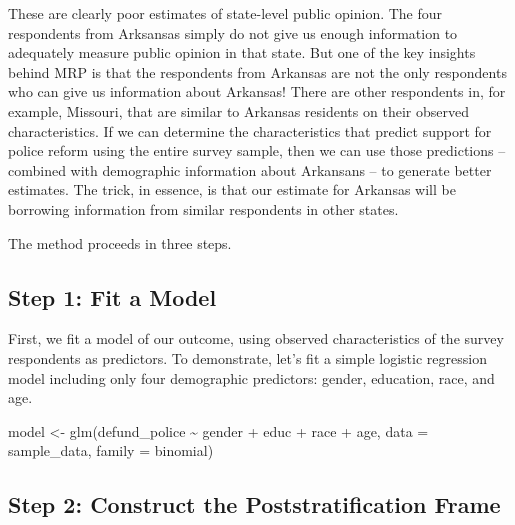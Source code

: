\documentclass[
]{article}
\newenvironment{Shaded}{\begin{snugshade}}{\end{snugshade}}
\newcommand{\AttributeTok}[1]{\textcolor[rgb]{0.77,0.63,0.00}{#1}}
\newcommand{\FunctionTok}[1]{\textcolor[rgb]{0.00,0.00,0.00}{#1}}
\newcommand{\NormalTok}[1]{#1}
\newcommand{\OtherTok}[1]{\textcolor[rgb]{0.56,0.35,0.01}{#1}}
\newcommand{\SpecialCharTok}[1]{\textcolor[rgb]{0.00,0.00,0.00}{#1}}
\newcommand{\StringTok}[1]{\textcolor[rgb]{0.31,0.60,0.02}{#1}}
\begin{document}
These are clearly poor estimates of state-level public opinion. The four
respondents from Arksansas simply do not give us enough information to
adequately measure public opinion in that state. But one of the key
insights behind MRP is that the respondents from Arkansas are not the
only respondents who can give us information about Arkansas! There are
other respondents in, for example, Missouri, that are similar to
Arkansas residents on their observed characteristics. If we can
determine the characteristics that predict support for police reform
using the entire survey sample, then we can use those predictions --
combined with demographic information about Arkansans -- to generate
better estimates. The trick, in essence, is that our estimate for
Arkansas will be borrowing information from similar respondents in other
states.

The method proceeds in three steps.

\hypertarget{step-1-fit-a-model}{%
\subsection{Step 1: Fit a Model}\label{step-1-fit-a-model}}

First, we fit a model of our outcome, using observed characteristics of
the survey respondents as predictors. To demonstrate, let's fit a simple
logistic regression model including only four demographic predictors:
gender, education, race, and age.

\begin{Shaded}
\begin{Highlighting}[]
\NormalTok{model }\OtherTok{\textless{}{-}} \FunctionTok{glm}\NormalTok{(defund\_police }\SpecialCharTok{\textasciitilde{}}
\NormalTok{              gender }\SpecialCharTok{+}\NormalTok{ educ }\SpecialCharTok{+}\NormalTok{ race }\SpecialCharTok{+}\NormalTok{ age,}
            \AttributeTok{data =}\NormalTok{ sample\_data,}
            \AttributeTok{family =} \StringTok{\textquotesingle{}binomial\textquotesingle{}}\NormalTok{)}
\end{Highlighting}
\end{Shaded}

\hypertarget{step-2-construct-the-poststratification-frame}{%
\subsection{Step 2: Construct the Poststratification
Frame}\label{step-2-construct-the-poststratification-frame}}
\end{document}
